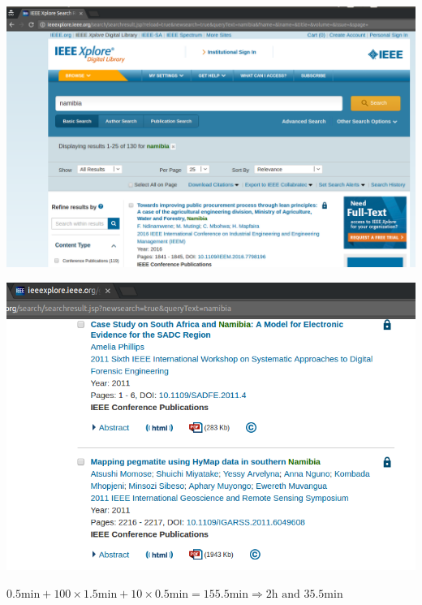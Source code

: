 \documentclass{beamer}
\begin{document}
\begin{frame}
\begin{center}
    \includegraphics[width=\textwidth]{static/ieee_search.png}
\end{center}
\end{frame}

\begin{frame}
\begin{center}
    \includegraphics[width=\textwidth]{static/namibia_search.png}
\end{center}
\end{frame}

\begin{frame}
\begin{center}
\color{yellow!79}\Large{$0.5 \textrm{min} + \textrm{100} \times 1.5 \textrm{min} + 10 \times 0.5
\textrm{min}= 155.5 \textrm{min} \Rightarrow 2 \textrm{h} \textrm{ and } 35.5
\textrm{min}$}
\end{center}
\end{frame}
\end{document}
